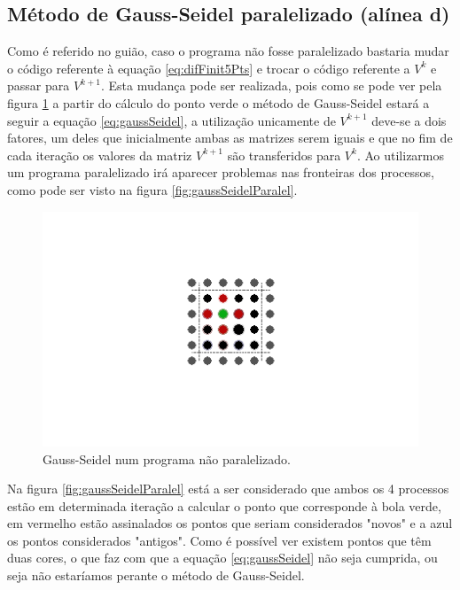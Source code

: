 \documentclass[10pt]{extarticle}
\begin{document}
\pagebreak

\subsection{Método de Gauss-Seidel paralelizado (alínea d)}

Como é referido no guião, caso o programa não fosse paralelizado bastaria mudar o código referente à equação \ref{eq:difFinit5Pts} e trocar o código referente a $V^{k}$ e passar para $V^{k+1}$. Esta mudança pode ser realizada, pois como se pode ver pela figura \ref{fig:gaussSeidelNParalel} a partir do cálculo do ponto verde o método de Gauss-Seidel estará a seguir a equação \ref{eq:gaussSeidel}, a utilização unicamente de $V^{k+1}$ deve-se a dois fatores, um deles que inicialmente ambas as matrizes serem iguais e que no fim de cada iteração os valores da matriz $V^{k+1}$ são transferidos para $V^{k}$. Ao utilizarmos um programa paralelizado irá aparecer problemas nas fronteiras dos processos, como pode ser visto na figura \ref{fig:gaussSeidelParalel}.

\begin{figure}[H]
  \centering
  \includegraphics[width=\linewidth]{model_code_parallelization_nparalel_alinead.png}
  \caption{Gauss-Seidel num programa não paralelizado.}
  \label{fig:gaussSeidelNParalel}
  \end{figure}
\pagebreak
Na figura \ref{fig:gaussSeidelParalel} está a ser considerado que ambos os 4 processos estão em determinada iteração a calcular o ponto que corresponde à bola verde, em vermelho estão assinalados os pontos que seriam considerados "novos" e a azul os pontos considerados "antigos". Como é possível ver existem pontos que têm duas cores, o que faz com que a equação \ref{eq:gaussSeidel} não seja cumprida, ou seja não estaríamos perante o método de Gauss-Seidel.
\end{document}
